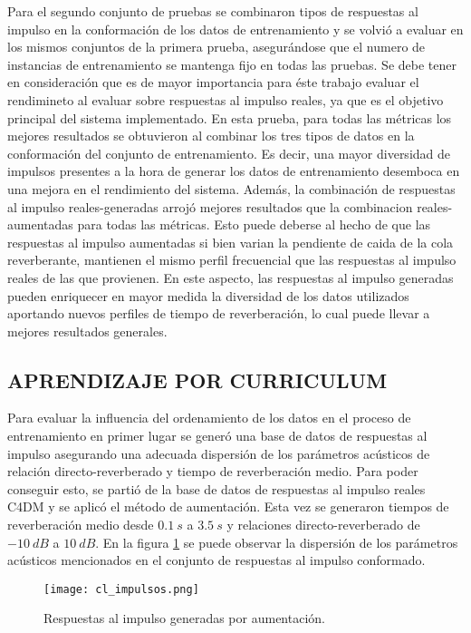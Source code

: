 Para el segundo conjunto de pruebas se combinaron tipos de respuestas al impulso en la conformación de los datos de entrenamiento y se volvió a evaluar en los mismos conjuntos de la primera prueba, asegurándose que el numero de instancias de entrenamiento se mantenga fijo en todas las pruebas. Se debe tener en consideración que es de mayor importancia para éste trabajo evaluar el rendimineto al evaluar sobre respuestas al impulso reales, ya que es el objetivo principal del sistema implementado. En esta prueba, para todas las métricas los mejores resultados se obtuvieron al combinar los tres tipos de datos en la conformación del conjunto de entrenamiento. Es decir, una mayor diversidad de impulsos presentes a la hora de generar los datos de entrenamiento desemboca en una mejora en el rendimiento del sistema. Además, la combinación de respuestas al impulso reales-generadas arrojó mejores resultados que la combinacion reales-aumentadas para todas las métricas. Esto puede deberse al hecho de que las respuestas al impulso aumentadas si bien varian la pendiente de caida de la cola reverberante, mantienen el mismo perfil frecuencial que las respuestas al impulso reales de las que provienen. En este aspecto, las respuestas al impulso generadas pueden enriquecer en mayor medida la diversidad de los datos utilizados aportando nuevos perfiles de tiempo de reverberación, lo cual puede llevar a mejores resultados generales. 


\subsection[Aprendizaje por curriculum]{APRENDIZAJE POR CURRICULUM}
Para evaluar la influencia del ordenamiento de los datos en el proceso de entrenamiento en primer lugar se generó una base de datos de respuestas al impulso asegurando una adecuada dispersión de los parámetros acústicos de relación directo-reverberado y tiempo de reverberación medio. Para poder conseguir esto, se partió de la base de datos de respuestas al impulso reales C4DM y se aplicó el método de aumentación. Esta vez se generaron tiempos de reverberación medio desde $0.1 \ s$ a $3.5 \ s$ y relaciones directo-reverberado de $-10 \ dB$ a $10 \ dB$. En la figura \ref{fig:cl_impulsos} se puede observar la dispersión de los parámetros acústicos mencionados en el conjunto de respuestas al impulso conformado.

\begin{figure}[H]
	\centering{}
	\texttt{[image: cl\_impulsos.png]}
	\caption{Respuestas al impulso generadas por aumentación.}
	\label{fig:cl_impulsos}
\end{figure}


